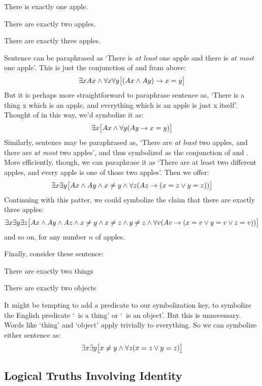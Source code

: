 \begin{earg}
\item[\ex{exactly1}] There is exactly one apple.
\item[\ex{exactly2}] There are exactly two apples.
\item[\ex{exactly3}] There are exactly three apples.
\end{earg}
Sentence  can be paraphrased as `There is \emph{at least} one apple and there is \emph{at most} one apple'. This is just the conjunction of  and   from above:
$$\exists x Ax \wedge \forall x\forall y\bigl[(Ax \wedge Ay) \rightarrow x=y\bigr]$$
But it is perhaps more straightforward to paraphrase sentence  as, `There is a thing x which is an apple, and everything which is an apple is just x itself'. Thought of in this way, we'd symbolize it as:
$$\exists x\bigl[Ax \wedge \forall y(Ay \rightarrow x= y)\bigr]$$
Similarly, sentence  may be paraphrased as, `There are \emph{at least} two apples, and there are \emph{at most} two apples', and thus symbolized as the conjunction of  and .
More efficiently, though, we can paraphrase it as `There are at least two different apples, and every apple is one of those two apples'. Then we offer:
$$\exists x\exists y\bigl[Ax \wedge Ay \wedge x \neq y \wedge \forall z(Az \rightarrow ( x= z \vee y = z))\bigr]$$
Continuing with this patter, we could symbolize the claim that there are exactly three apples:
$$\exists x \exists y \exists z\bigl[Ax \wedge Ay \wedge Az \wedge x \neq y \wedge x \neq z \wedge y \neq z \wedge \forall v(Av \rightarrow (x = v \vee y = v \vee z = v))\bigr]$$
and so on, for any number $n$ of apples.

Finally, consider these sentence:
\begin{earg}
\item[\ex{exactly2things}] There are exactly two things
\item[\ex{exactly2objects}] There are exactly two objects
\end{earg}
It might be tempting to add a predicate to our symbolization key, to symbolize the English predicate `\blank\ is a thing' or `\blank\ is an object'. But this is unnecessary. Words like `thing' and `object' apply trivially to everything. So we can symbolize either sentence as:
		$$\exists x \exists y \bigl[x \neq y \wedge \forall z(x=z \vee y = z)\bigr]$$

\subsection{Logical Truths Involving Identity}\label{s:LogicalTruthsID}


